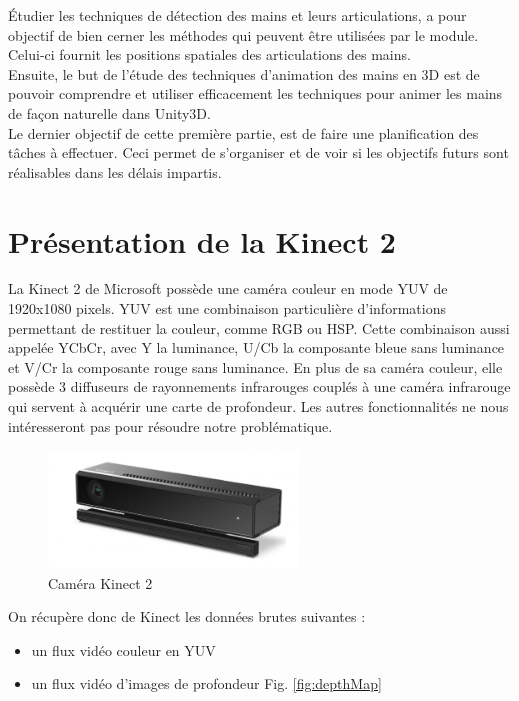 Étudier les techniques de détection des mains et leurs articulations, 
a pour objectif de bien cerner les méthodes qui peuvent être utilisées 
par le module. Celui-ci fournit les positions spatiales des 
articulations des mains.\\

Ensuite, le but de l'étude des techniques d'animation des mains en 
3D est de pouvoir comprendre et utiliser efficacement les techniques pour animer les mains de façon naturelle dans Unity3D.\\

Le dernier objectif de cette première partie, est de faire une 
planification des tâches à effectuer. Ceci permet de s'organiser et 
de voir si les objectifs futurs sont réalisables dans les délais 
impartis.\\  


\section{Présentation de la Kinect 2}
La Kinect 2 de Microsoft possède une caméra couleur en mode YUV de 1920x1080 pixels.
YUV est une combinaison particulière d'informations permettant de restituer la couleur, comme RGB ou HSP.
Cette combinaison aussi appelée YCbCr, avec Y la luminance, U/Cb la composante bleue sans luminance et V/Cr la composante rouge sans luminance.
En plus de sa caméra couleur, elle possède 3 diffuseurs de rayonnements infrarouges couplés à une caméra infrarouge qui servent à acquérir une carte de profondeur.
Les autres fonctionnalités ne nous intéresseront pas pour résoudre notre problématique.\\

\begin{figure}[H]
 \center
 \includegraphics[width=250px]{images/kinect-v2.png}
 \caption{Caméra Kinect 2}
\end{figure}

On récupère donc de Kinect les données brutes suivantes : 
\begin{itemize}
 \item un flux vidéo couleur en YUV
 \item un flux vidéo d'images de profondeur Fig. \ref{fig:depthMap}
\end{itemize}

